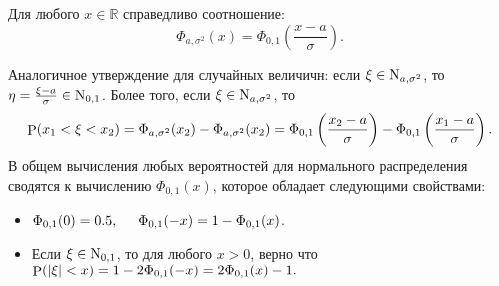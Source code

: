 \begin{to_lem}
    Для любого $x \in \mathbb{R}$ справедливо соотношение:
    \begin{equation*}
        \Phi_{a, \sigma^2} (x) = \Phi_{0, 1} \left(
            \frac{x-a}{\sigma}
        \right).
    \end{equation*}
\end{to_lem}


Аналогичное утверждение для случайных величичн: если $\xi \in \textnormal{N}_{a, \sigma^2}$, то $\eta = \frac{\xi-a}{\sigma} \in \textnormal{N}_{0, 1}$. Более того, если $\xi \in \textnormal{N}_{a, \sigma^2}$, то
\begin{equation*}
    \P (x_1 < \xi < x_2) = \Phi_{a, \sigma^2} (x_2) - \Phi_{a, \sigma^2} (x_2) = \Phi_{0, 1} \left(
        \frac{x_2 - a}{\sigma}
    \right) - \Phi_{0, 1} \left(
        \frac{x_1 - a}{\sigma}
    \right).
\end{equation*}
В общем вычисления любых вероятностей для нормального распределения сводятся к вычислению $\Phi_{0, 1} (x)$, которое обладает следующими свойствами:
\begin{itemize}
    \item $\Phi_{0, 1} (0) = 0.5, \hspace{5 mm} \Phi_{0, 1} (-x) = 1 - \Phi_{0, 1} (x)$.
    \item Если $\xi \in \textnormal{N}_{0, 1}$, то для любого $x > 0$, верно что
    $
        \P (|\xi| < x) = 1 - 2 \Phi_{0, 1} (-x) = 2 \Phi_{0, 1} (x) - 1.
    $
\end{itemize}

